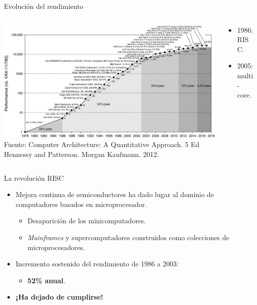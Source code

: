 \begin{frame}{Evolución del rendimiento}
\begin{columns}
  \begin{column}{.75\textwidth}
    \includegraphics[width=\textwidth]{images/perf-evol.jpg}\\
    {\tiny Fuente: Computer Architecture: A Quantitative Approach. 5 Ed
Hennessy and Patterson. Morgan Kaufmann. 2012.}
  \end{column}
  \begin{column}[T]{.25\textwidth}
    \begin{itemize}
      \item 1986: \alert{RISC}.
      \item 2005: \alert{multi-core}.
    \end{itemize}
  \end{column}
\end{columns}
\end{frame}

\begin{frame}[t]{La revolución RISC}
\begin{itemize}
  \item Mejora continua de semiconductores ha dado lugar al dominio de computadores 
        basados en microprocesador.
    \begin{itemize}
      \item Desaparición de los minicomputadores.
      \item \emph{Mainframes} y supercomputadores construidos como colecciones de microprocesadores.
    \end{itemize}
  \item Incremento sostenido del rendimiento de 1986 a 2003:
    \begin{itemize}
      \item \textbf{\alert{52\% anual}}.
    \end{itemize}
  \item \textbf{¡Ha dejado de cumplirse!}
\end{itemize}
\end{frame}
